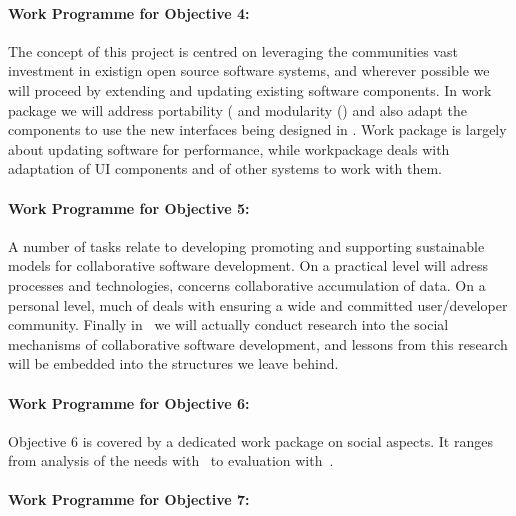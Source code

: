 \documentclass[noworkareas,deliverables,\classoptions]{euproposal}       %
\begin{document}
\begin{proposal}
\paragraph{Work Programme for Objective 4: }

The concept of this project is centred on leveraging the communities
vast investment in existign open source software systems, and wherever
possible we will proceed by extending and updating existing software components.
In work package  we will address
portability ( and
modularity () and also
adapt the components to use the new interfaces being designed in
. Work package
 is largely about updating software for performance, while
workpackage  deals with adaptation of UI components and of
other systems to work with them.

\paragraph{Work Programme for Objective 5: }

A number of tasks relate to developing promoting and supporting
sustainable models for collaborative software development. On a
practical level  will adress
processes and technologies,  concerns
collaborative accumulation of data. On a personal level, much of
 deals with ensuring a wide and committed user/developer
community. Finally in~
we will actually conduct research into the social mechanisms of
collaborative software development, and lessons from this research
will be embedded into the structures we leave behind.

\paragraph{Work Programme for Objective 6: }

Objective 6 is covered by a dedicated work package  on social aspects.
It ranges from analysis of the needs with~ to
evaluation with~.

\paragraph{Work Programme for Objective 7: }


\end{proposal}
\end{document}
